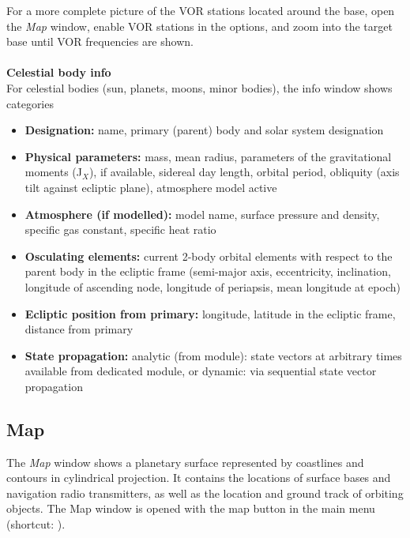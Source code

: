 \documentclass[Orbiter User Manual.tex]{subfiles}
\begin{document}
\noindent
For a more complete picture of the VOR stations located around the base, open the \textit{Map} window, enable VOR stations in the options, and zoom into the target base until VOR frequencies are shown.\\
\\
\textbf{Celestial body info}\\
For celestial bodies (sun, planets, moons, minor bodies), the info window shows categories

\begin{figure}[H]
	\centering
\end{figure}

\noindent
\begin{itemize}
\item \textbf{Designation:} name, primary (parent) body and solar system designation
\item \textbf{Physical parameters:} mass, mean radius, parameters of the gravitational moments (J$_{X}$), if available, sidereal day length, orbital period, obliquity (axis tilt against ecliptic plane), atmosphere model active
\item \textbf{Atmosphere (if modelled):} model name, surface pressure and density, specific gas constant, specific heat ratio
\item \textbf{Osculating elements:} current 2-body orbital elements with respect to the parent body in the ecliptic frame (semi-major axis, eccentricity, inclination, longitude of ascending node, longitude of periapsis, mean longitude at epoch)
\item \textbf{Ecliptic position from primary:} longitude, latitude in the ecliptic frame, distance from primary
\item \textbf{State propagation:} analytic (from module): state vectors at arbitrary times available from dedicated module, or dynamic: via sequential state vector propagation
\end{itemize}


\subsection{Map}
The \textit{Map} window shows a planetary surface represented by coastlines and contours in cylindrical projection. It contains the locations of surface bases and navigation radio transmitters, as well as the location and ground track of orbiting objects. The Map window is opened with the map button in the main menu (shortcut: \Ctrl{}).
\end{document}
